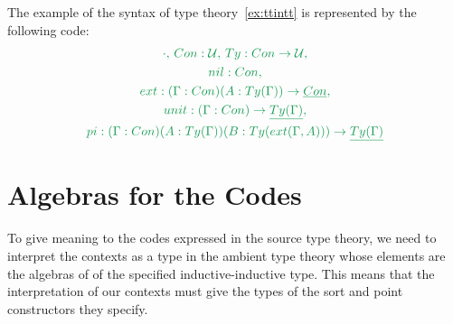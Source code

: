 \documentclass[12pt,headings=optiontohead,openany,oneside,a4paper]{book}
\theoremstyle{definition}
\newcommand{\UU}{\mathcal{U}}
\newcommand{\gr}[1]{{\color{ForestGreen}#1}}
\newcommand{\grm}[1]{\ensuremath{\gr{#1}}}
\begin{document}
\begin{example}
The example of the syntax of type theory~\ref{ex:ttintt} is represented by the
following code:
\begin{multline*}
\grm{\cdot,\, \mathop{Con} : \UU,\, \mathop{Ty} : \mathop{Con} \to \UU,} \\
\grm{\mathop{nil} : \mathop{Con},} \\
\grm{\mathop{ext} : (\Gamma : \mathop{Con})(A : \mathop{Ty}(\Gamma)) \to \underline{\mathop{Con}},} \\
\grm{\mathop{unit} : (\Gamma : \mathop{Con}) \to \underline{\mathop{Ty}(\Gamma)},} \\
\grm{\mathop{pi} : (\Gamma : \mathop{Con})(A : \mathop{Ty}(\Gamma))(B : \mathop{Ty}(\mathop{ext}(\Gamma, A))) \to \underline{\mathop{Ty}(\Gamma)}}
\end{multline*} %
\end{example}

\section{Algebras for the Codes}

To give meaning to the codes expressed in the source type theory, we need to
interpret the contexts as a type in the ambient type theory whose elements are
the algebras of of the specified inductive-inductive type.
This means that the interpretation of our contexts must give the types of the
sort and point constructors they specify.
\end{document}
